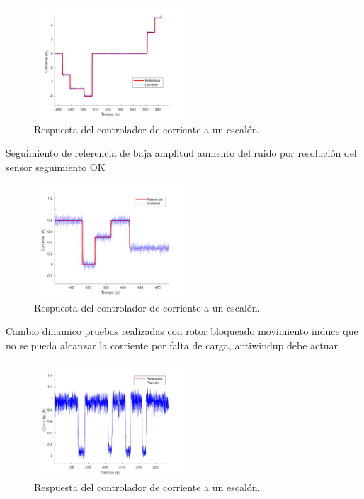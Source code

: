 \begin{figure}[h]
  \centering
  \includegraphics[width=0.5\textwidth]{img/cap5/corriente_cambio_referencia_alto.pdf}
  \caption{Respuesta del controlador de corriente a un escalón.}
  \label{cap5_corriente_cambio_referencia_alto}
\end{figure}


Seguimiento de referencia de baja amplitud
aumento del ruido por resolución del sensor
seguimiento OK

\begin{figure}[h]
  \centering
  \includegraphics[width=0.5\textwidth]{img/cap5/corriente_cambio_referencia_bajo.pdf}
  \caption{Respuesta del controlador de corriente a un escalón.}
  \label{cap5_corriente_cambio_referencia_bajo}
\end{figure}




Cambio dinamico
pruebas realizadas con rotor bloqueado
movimiento induce que no se pueda alcanzar la corriente por falta de carga, antiwindup debe actuar

\begin{figure}[H]
  \centering
  \includegraphics[width=0.5\textwidth]{img/cap5/cambio_dinamico_corriente.pdf}
  \caption{Respuesta del controlador de corriente a un escalón.}
  \label{cap5_cambio_dinamico_corriente}
\end{figure}


